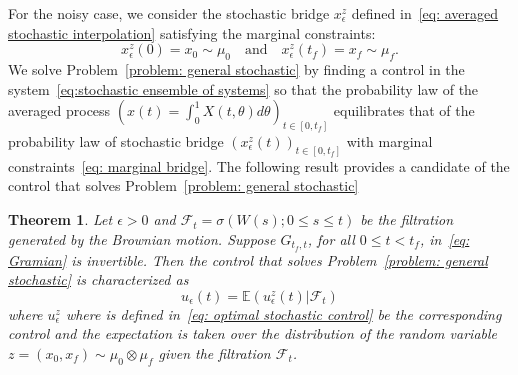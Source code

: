 \documentclass[12pt]{amsart}
\newtheorem{theorem}{Theorem}[section]
\renewcommand{\(}{\left (}
\renewcommand{\)}{\right )}
\numberwithin{equation}{section}
\begin{document}
For the noisy case, we consider the stochastic bridge $x_{\epsilon}^z$ defined in~\eqref{eq: averaged stochastic interpolation} satisfying the marginal constraints:
\begin{equation}\label{eq: marginal bridge}
x_{\epsilon}^z(0)=x_0\sim\mu_0\quad\text{and}\quad x_{\epsilon}^z(t_f)=x_f\sim\mu_f.  \end{equation}
We solve Problem~\ref{problem: general stochastic} by finding a control in the system~\eqref{eq:stochastic ensemble of systems} so that the probability law of the averaged process $\left(x(t)=\int_0^1X(t,\theta)d\theta\right)_{t\in[0,t_f]}$ equilibrates that of the probability law of stochastic bridge $(x_{\epsilon}^z(t))_{t\in[0,t_f]}$ with marginal constraints~\eqref{eq: marginal bridge}. The following result provides a candidate of the control that solves Problem~\ref{problem: general stochastic}
\begin{theorem}
Let $\epsilon>0$ and $\mathcal{F}_t=\sigma(W(s); 0\leq s\leq t)$ be the filtration generated by the Brownian motion.  Suppose $G_{t_f,t}$, for all $0\leq t<t_f$, in~\eqref{eq: Gramian} is invertible. Then the control that solves Problem~\ref{problem: general stochastic} is characterized as
\begin{equation}\label{eq: proposed control}
u_{\epsilon}(t)=\mathbb{E}(u_{\epsilon}^z(t)|\mathcal{F}_t)    
\end{equation}
where $u_{\epsilon}^z$ where is defined in~\eqref{eq: optimal stochastic control} be the corresponding control and the expectation is taken over the distribution of the random variable $z=(x_0,x_f)\sim\mu_0\otimes\mu_f$ given the filtration $\mathcal{F}_t$.
\end{theorem}
\end{document}
